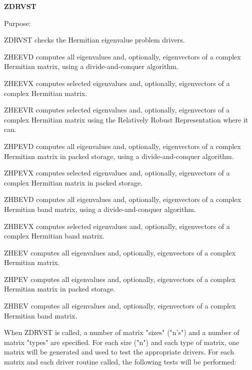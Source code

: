 {\bfseries Z\+D\+R\+V\+S\+T} 

\begin{DoxyParagraph}{Purpose\+: }
\begin{DoxyVerb}      ZDRVST  checks the Hermitian eigenvalue problem drivers.

              ZHEEVD computes all eigenvalues and, optionally,
              eigenvectors of a complex Hermitian matrix,
              using a divide-and-conquer algorithm.

              ZHEEVX computes selected eigenvalues and, optionally,
              eigenvectors of a complex Hermitian matrix.

              ZHEEVR computes selected eigenvalues and, optionally,
              eigenvectors of a complex Hermitian matrix
              using the Relatively Robust Representation where it can.

              ZHPEVD computes all eigenvalues and, optionally,
              eigenvectors of a complex Hermitian matrix in packed
              storage, using a divide-and-conquer algorithm.

              ZHPEVX computes selected eigenvalues and, optionally,
              eigenvectors of a complex Hermitian matrix in packed
              storage.

              ZHBEVD computes all eigenvalues and, optionally,
              eigenvectors of a complex Hermitian band matrix,
              using a divide-and-conquer algorithm.

              ZHBEVX computes selected eigenvalues and, optionally,
              eigenvectors of a complex Hermitian band matrix.

              ZHEEV computes all eigenvalues and, optionally,
              eigenvectors of a complex Hermitian matrix.

              ZHPEV computes all eigenvalues and, optionally,
              eigenvectors of a complex Hermitian matrix in packed
              storage.

              ZHBEV computes all eigenvalues and, optionally,
              eigenvectors of a complex Hermitian band matrix.

      When ZDRVST is called, a number of matrix "sizes" ("n's") and a
      number of matrix "types" are specified.  For each size ("n")
      and each type of matrix, one matrix will be generated and used
      to test the appropriate drivers.  For each matrix and each
      driver routine called, the following tests will be performed:


\end{DoxyVerb}
\end{DoxyParagraph}
